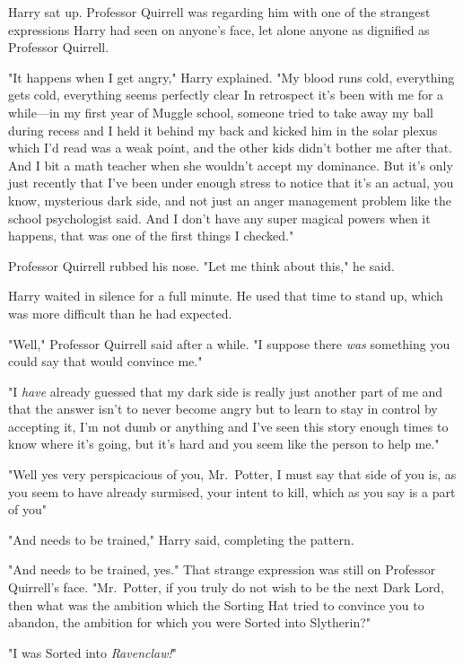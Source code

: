 Harry sat up. Professor Quirrell was regarding him with one of the strangest
expressions Harry had seen on anyone's face, let alone anyone as dignified as
Professor Quirrell.

"It happens when I get angry," Harry explained. "My blood runs cold, everything
gets cold, everything seems perfectly clear{\el} In retrospect it's been
with me for a while---in my first year of Muggle school, someone tried to take
away my ball during recess and I held it behind my back and kicked him in the
solar plexus which I'd read was a weak point, and the other kids didn't bother
me after that. And I bit a math teacher when she wouldn't accept my dominance.
But it's only just recently that I've been under enough stress to notice that
it's an actual, you know, mysterious dark side, and not just an anger
management problem like the school psychologist said. And I don't have any
super magical powers when it happens, that was one of the first things I
checked."

Professor Quirrell rubbed his nose. "Let me think about this," he said.

Harry waited in silence for a full minute. He used that time to stand up, which
was more difficult than he had expected.

"Well," Professor Quirrell said after a while. "I suppose there \emph{was}
something you could say that would convince me."

"I \emph{have} already guessed that my dark side is really just another part of
me and that the answer isn't to never become angry but to learn to stay in
control by accepting it, I'm not dumb or anything and I've seen this story
enough times to know where it's going, but it's hard and you seem like the
person to help me."

"Well{\el} yes{\el} very perspicacious of you, Mr.~Potter, I must
say{\el} that side of you is, as you seem to have already surmised, your
intent to kill, which as you say is a part of you{\el}"

"And needs to be trained," Harry said, completing the pattern.

"And needs to be trained, yes." That strange expression was still on Professor
Quirrell's face. "Mr.~Potter, if you truly do not wish to be the next Dark
Lord, then what was the ambition which the Sorting Hat tried to convince you to
abandon, the ambition for which you were Sorted into Slytherin?"

"I was Sorted into \emph{Ravenclaw!}"

